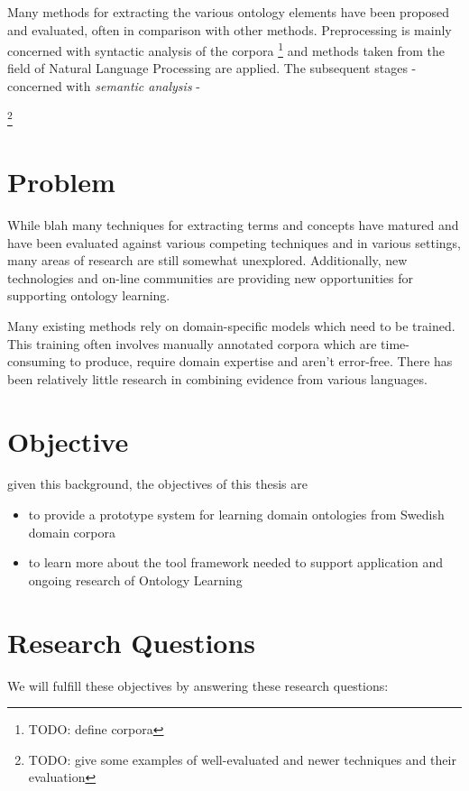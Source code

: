 \documentclass[a4paper]{report}
\newcommand{\todo}[1]{\footnote{{\color{red} TODO: #1}}}
\begin{document}
Many methods for extracting the various ontology elements have been proposed and evaluated, often in comparison with other methods.
Preprocessing is mainly concerned with syntactic analysis of the corpora \todo{define corpora} and methods taken from the field of Natural Language Processing are applied.
The subsequent stages - concerned with \emph{semantic analysis} - 

\todo{give some examples of well-evaluated and newer techniques and their evaluation}

\section{Problem}

While blah many techniques for extracting terms and concepts have matured and have been evaluated against various competing techniques and in various settings, many areas of research are still somewhat unexplored.
Additionally, new technologies and on-line communities are providing new opportunities for supporting ontology learning.

Many existing methods rely on domain-specific models which need to be trained.
This training often involves manually annotated corpora which are time-consuming to produce, require domain expertise and aren't error-free.
There has been relatively little research in combining evidence from various languages.

\section{Objective}

given this background, the objectives of this thesis are

\begin{itemize}
  \item to provide a prototype system for learning domain ontologies from Swedish domain corpora
  \item to learn more about the tool framework needed to support application and ongoing research of Ontology Learning
\end{itemize}

\section{Research Questions}

We will fulfill these objectives by answering these research questions:
\end{document}
